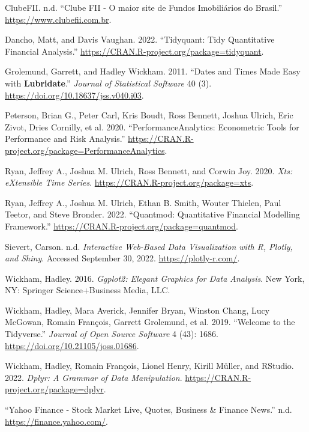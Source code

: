 \documentclass[
  letterpaper,
  DIV=11,
  numbers=noendperiod]{scrartcl}
\newlength{\cslhangindent}
\newlength{\cslentryspacingunit} %
\newenvironment{CSLReferences}[2] %
 {%
  \setlength{\parindent}{0pt}
  \ifodd #1
  \let\oldpar\par
  \def\par{\hangindent=\cslhangindent\oldpar}
  \fi
  \setlength{\parskip}{#2\cslentryspacingunit}
 }%
 {}
\begin{document}
\hypertarget{refs}{}
\begin{CSLReferences}{1}{0}
\leavevmode{}%
ClubeFII. n.d. {``Clube FII - O maior site de Fundos Imobiliários do
Brasil.''} \url{https://www.clubefii.com.br}.

\leavevmode{}%
Dancho, Matt, and Davis Vaughan. 2022. {``Tidyquant: {Tidy}
{Quantitative} {Financial} {Analysis}.''}
\url{https://CRAN.R-project.org/package=tidyquant}.

\leavevmode{}%
Grolemund, Garrett, and Hadley Wickham. 2011. {``Dates and {Times}
{Made} {Easy} with \textbf{Lubridate}.''} \emph{Journal of Statistical
Software} 40 (3). \url{https://doi.org/10.18637/jss.v040.i03}.

\leavevmode{}%
Peterson, Brian G., Peter Carl, Kris Boudt, Ross Bennett, Joshua Ulrich,
Eric Zivot, Dries Cornilly, et al. 2020. {``{PerformanceAnalytics}:
{Econometric} {Tools} for {Performance} and {Risk} {Analysis}.''}
\url{https://CRAN.R-project.org/package=PerformanceAnalytics}.

\leavevmode{}%
Ryan, Jeffrey A., Joshua M. Ulrich, Ross Bennett, and Corwin Joy. 2020.
\emph{Xts: eXtensible Time Series}.
\url{https://CRAN.R-project.org/package=xts}.

\leavevmode{}%
Ryan, Jeffrey A., Joshua M. Ulrich, Ethan B. Smith, Wouter Thielen, Paul
Teetor, and Steve Bronder. 2022. {``Quantmod: {Quantitative} {Financial}
{Modelling} {Framework}.''}
\url{https://CRAN.R-project.org/package=quantmod}.

\leavevmode{}%
Sievert, Carson. n.d. \emph{Interactive Web-Based Data Visualization
with {R}, Plotly, and Shiny}. Accessed September 30, 2022.
\url{https://plotly-r.com/}.

\leavevmode{}%
Wickham, Hadley. 2016. \emph{Ggplot2: Elegant Graphics for Data
Analysis}. New York, NY: Springer Science+Business Media, LLC.

\leavevmode{}%
Wickham, Hadley, Mara Averick, Jennifer Bryan, Winston Chang, Lucy
McGowan, Romain François, Garrett Grolemund, et al. 2019. {``Welcome to
the {Tidyverse}.''} \emph{Journal of Open Source Software} 4 (43): 1686.
\url{https://doi.org/10.21105/joss.01686}.

\leavevmode{}%
Wickham, Hadley, Romain François, Lionel Henry, Kirill Müller, and
RStudio. 2022. \emph{Dplyr: A Grammar of Data Manipulation}.
\url{https://CRAN.R-project.org/package=dplyr}.

\leavevmode{}%
{``Yahoo Finance - Stock Market Live, Quotes, Business \& Finance
News.''} n.d. \url{https://finance.yahoo.com/}.

\end{CSLReferences}
\end{document}
